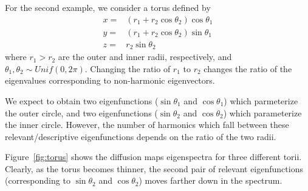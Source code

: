 \documentclass[preprint]{elsarticle}
\begin{document}
For the second example, we consider a torus defined by
%
\begin{equation}
\begin{aligned}
x =& (r_1 + r_2 \cos \theta_2 ) \cos \theta_1 \\
y =& (r_1 + r_2 \cos \theta_2 ) \sin \theta_1 \\
z =& r_2 \sin \theta_2
\end{aligned}
\end{equation}
%
where $r_1 > r_2$ are the outer and inner radii, respectively, and $\theta_1, \theta_2 \sim Unif(0, 2 \pi)$. 
%
Changing the ratio of $r_1$ to $r_2$ changes the ratio of the eigenvalues corresponding to non-harmonic eigenvectors. 

We expect to obtain two eigenfunctions ($\sin \theta_1$ and $\cos \theta_1$) which parmeterize the outer circle, and two eigenfunctions ($\sin \theta_2$ and $\cos \theta_2$) which parameterize the inner circle. 
%
However, the number of harmonics which fall between these relevant/descriptive eigenfunctions depends on the ratio of the two radii. 

Figure~\ref{fig:torus} shows the diffusion maps eigenspectra for three different torii. 
%
Clearly, as the torus becomes thinner, the second pair of relevant eigenfunctions (corresponding to $\sin \theta_2$ and $\cos \theta_2$) moves farther down in the spectrum. 
\end{document}
